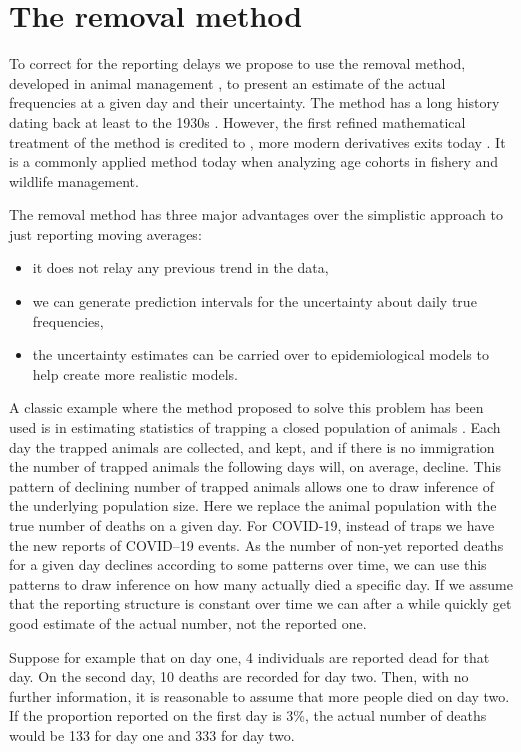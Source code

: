 \documentclass[a4paper,11pth]{article}
\begin{document}
\section{The removal method}
To correct for the reporting delays we propose to use the removal method, developed in animal management \citep{Pollock1991_review_papers}, to present an estimate of the actual frequencies at a given day and their uncertainty. The method has a long history dating back at least to the 1930s \citep{Leslie1939_attempt_determine}. However, the first refined mathematical treatment of the method is credited to \cite{Moran1951_mathematical_theory}, more modern derivatives exits today \citep{Matechou2016_open_models}. It is a commonly applied method today when analyzing age cohorts in fishery and wildlife management.

The removal method has three major advantages over the simplistic approach to just reporting moving averages:

\begin{itemize}
	\item it does not relay any previous trend in the data,
	\item we can generate prediction intervals for the uncertainty about daily true frequencies,
	\item the uncertainty estimates can be carried over to epidemiological models to help create more realistic models.
\end{itemize}

A classic example where the method proposed to solve this problem has been used is in estimating statistics of trapping a closed population of animals \citep{Pollock1991_review_papers}. Each day the trapped animals are collected, and kept, and if there is no immigration the number of trapped animals the following days will, on average, decline. This pattern of declining number of trapped animals allows one to draw inference of the underlying population size. Here we replace the animal population with the true number of deaths on a given day. For COVID-19, instead of traps we have the new reports of COVID--19 events. As the number of non-yet reported deaths for a given day declines according to some patterns over time, we can use this patterns to draw inference on how many actually died a specific day. If we assume that the reporting structure is constant over time we can after a while quickly get good estimate of the actual number, not the reported one.

Suppose for example that on day one, 4 individuals are reported dead for that day. On the second day, 10 deaths are recorded for day two. Then, with no further information, it is reasonable to assume that more people died on day two. If the proportion reported on the first day is 3\%, the actual number of deaths would be 133 for day one and 333 for day two.
\end{document}
